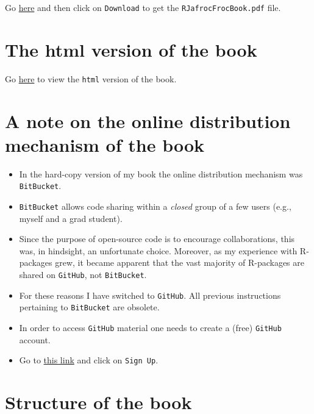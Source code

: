 \documentclass[
]{book}
\providecommand{\tightlist}{%
  \setlength{\itemsep}{0pt}\setlength{\parskip}{0pt}}
\begin{document}
Go \href{https://github.com/dpc10ster/RJafrocFrocBook/blob/gh-pages/RJafrocFrocBook.pdf}{here} and then click on \texttt{Download} to get the \texttt{RJafrocFrocBook.pdf} file.

\hypertarget{the-html-version-of-the-book}{%
\section*{The html version of the book}\label{the-html-version-of-the-book}}

Go \href{https://dpc10ster.github.io/RJafrocFrocBook/}{here} to view the \texttt{html} version of the book.

\hypertarget{a-note-on-the-online-distribution-mechanism-of-the-book}{%
\section*{A note on the online distribution mechanism of the book}\label{a-note-on-the-online-distribution-mechanism-of-the-book}}

\begin{itemize}
\tightlist
\item
  In the hard-copy version of my book \citep{chakraborty2017observer} the online distribution mechanism was \texttt{BitBucket}.
\item
  \texttt{BitBucket} allows code sharing within a \emph{closed} group of a few users (e.g., myself and a grad student).
\item
  Since the purpose of open-source code is to encourage collaborations, this was, in hindsight, an unfortunate choice. Moreover, as my experience with R-packages grew, it became apparent that the vast majority of R-packages are shared on \texttt{GitHub}, not \texttt{BitBucket}.
\item
  For these reasons I have switched to \texttt{GitHub}. All previous instructions pertaining to \texttt{BitBucket} are obsolete.
\item
  In order to access \texttt{GitHub} material one needs to create a (free) \texttt{GitHub} account.
\item
  Go to \href{https://github.com}{this link} and click on \texttt{Sign\ Up}.
\end{itemize}

\hypertarget{structure-of-the-book}{%
\section*{Structure of the book}\label{structure-of-the-book}}
\end{document}
